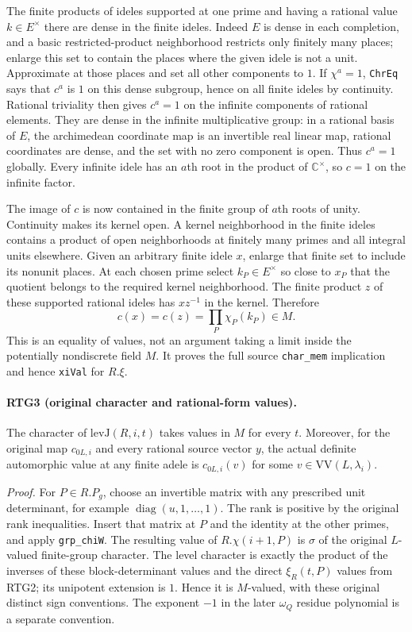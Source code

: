 The finite products of ideles supported at one prime and having a
rational value $k\in E^\times$ there are dense in the finite ideles.
Indeed $E$ is dense in each completion, and a basic restricted-product
neighborhood restricts only finitely many places; enlarge this set to
contain the places where the given idele is not a unit.  Approximate
at those places and set all other components to $1$.
If $\chi^a=1$, \texttt{ChrEq} says that $c^a$ is $1$ on this
dense subgroup, hence on all finite ideles by continuity.
Rational triviality then gives $c^a=1$ on the infinite components of
rational elements.  They are dense in the infinite multiplicative
group: in a rational basis of $E$, the archimedean coordinate map is
an invertible real linear map, rational coordinates are dense, and
the set with no zero component is open.  Thus $c^a=1$ globally.
Every infinite idele has an $a$th root in the product of
$\mathbb C^\times$, so $c=1$ on the infinite factor.

The image of $c$ is now contained in the finite group of $a$th roots
of unity.  Continuity makes its kernel open.  A kernel neighborhood
in the finite ideles contains a product of open neighborhoods at
finitely many primes and all integral units elsewhere.  Given an
arbitrary finite idele $x$, enlarge that finite set to include its
nonunit places.  At each chosen prime select $k_P\in E^\times$
so close to $x_P$ that the quotient belongs to the required kernel
neighborhood.  The finite product $z$ of these supported rational
ideles has $xz^{-1}$ in the kernel.  Therefore
\[
 c(x)=c(z)=\prod_P\chi_P(k_P)\in M.
\]
This is an equality of values, not an argument taking a limit inside
the potentially nondiscrete field $M$.  It proves the full source
\texttt{char\_\allowbreak mem} implication and hence \texttt{xiVal} for $R.\xi$.

\paragraph{RTG3 (original character and rational-form values).}
\label{claim:RTG3}
The character of $\mathrm{levJ}(R,i,t)$ takes values in $M$ for every
$t$.  Moreover, for the original map $c_{0L,i}$ and every rational
source vector $y$, the actual definite automorphic value at any finite
adele is $c_{0L,i}(v)$ for some $v\in\mathrm{VV}(L,\lambda_i)$.

\emph{Proof.}
For $P\in R.P_g$, choose an invertible matrix with any prescribed
unit determinant, for example $\operatorname{diag}(u,1,\ldots,1)$.
The rank is positive by the original rank inequalities.  Insert that
matrix at $P$ and the identity at the other primes, and apply
\texttt{grp\_\allowbreak chiW}.  The resulting value of $R.\chi(i+1,P)$ is
$\sigma$ of the original $L$-valued finite-group character.
The level character is exactly the product of the inverses of these
block-determinant values and the direct $\xi_R(t,P)$ values from RTG2;
its unipotent extension is $1$.  Hence it is $M$-valued, with these
original distinct sign conventions.  The exponent $-1$ in the later
$\omega_Q$ residue polynomial is a separate convention.

